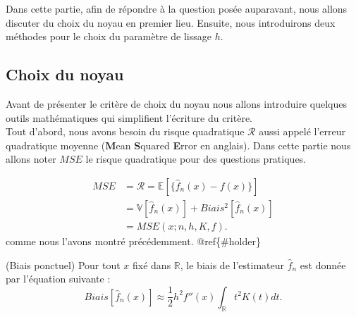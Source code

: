 \documentclass[
]{book}
\begin{document}
\hspace*{0.5cm} Dans cette partie, afin de répondre à la question posée auparavant, nous allons discuter du choix du noyau en premier lieu. Ensuite, nous introduirons deux méthodes pour le choix du paramètre de lissage \(h\).

\hypertarget{choix-du-noyau}{%
\subsection{Choix du noyau}\label{choix-du-noyau}}

\hspace*{0.5cm} Avant de présenter le critère de choix du noyau nous allons introduire quelques outils mathématiques qui simplifient l'écriture du critère.\\
Tout d'abord, nous avons besoin du risque quadratique \(\mathcal R\) aussi appelé l'erreur quadratique moyenne (\textbf{M}ean \textbf{S}quared \textbf{E}rror en anglais). Dans cette partie nous allons noter \(MSE\) le risque quadratique pour des questions pratiques.

\[
\begin{aligned}
MSE &= \mathcal R = \mathbb E \left[ \{  \hat f_n(x)-f(x) \} \right] \\
&=\mathbb V \left[ \hat f_n(x) \right] + Biais^2 \left[ \hat f_n(x) \right] \\
&= MSE(x ; n, h, K, f).
\end{aligned}
\]
comme nous l'avons montré précédemment. @ref\{\#holder\}

\begin{propri} (Biais ponctuel)
Pour tout $x$ fixé dans $\mathbb R$, le biais de l'estimateur $\hat f_n$ est donnée par l'équation suivante : 
$$Biais \left[ \hat f_n(x) \right] \approx \frac12h^2f''(x)\int_{\mathbb R} t^2K(t) dt.$$
\end{propri}
\end{document}
